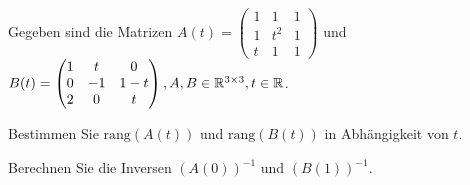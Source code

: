 \begin{Problem}
	Gegeben sind die Matrizen $A(t)=\begin{pmatrix} 1 & 1 & 1\\1 & t^2 & 1\\t & 1 & 1 \end{pmatrix} $ und $B(t)=\begin{pmatrix} 1 & t & 0 \\ 0 & -1 & 1-t \\ 2 & 0 & t \end{pmatrix}, A,B\in \mathbb{R}^{3\times 3}, t\in \mathbb{R}$.
	\begin{parts}
	\item Bestimmen Sie $\text{rang}(A(t))$ und $\text{rang}(B(t))$ in Abhängigkeit von $t$.
	\item Berechnen Sie die Inversen $(A(0))^{-1}$ und $(B(1))^{-1}$.
	\end{parts}
\end{Problem}
